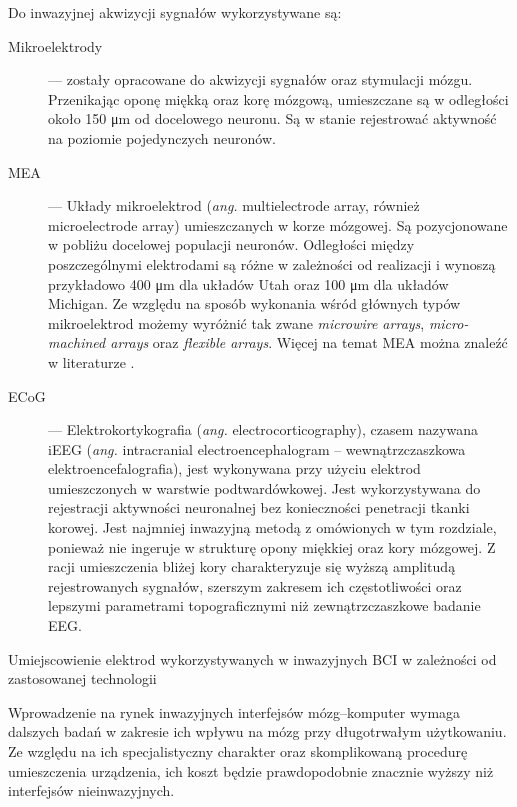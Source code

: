 \documentclass[skorowidz,skroty]{dyplomWEZUT}
\begin{document}
Do inwazyjnej akwizycji sygnałów wykorzystywane są:
\begin{description}
    \item [Mikroelektrody] --- zostały opracowane do akwizycji sygnałów oraz stymulacji mózgu. Przenikając oponę miękką oraz korę mózgową, umieszczane są w odległości około 150 μm od docelowego neuronu\cite{bci_signals_invasive}. Są w stanie rejestrować aktywność na poziomie pojedynczych neuronów.
    \item [MEA] --- Układy mikroelektrod (\textit{ang.} multielectrode array, również microelectrode array) umieszczanych w korze mózgowej. Są pozycjonowane w pobliżu docelowej populacji neuronów. Odległości między poszczególnymi elektrodami są różne w zależności od realizacji i wynoszą przykładowo 400 μm dla układów Utah oraz 100 μm dla układów Michigan\cite{bci_mea}. Ze względu na sposób wykonania wśród głównych typów mikroelektrod możemy wyróżnić tak zwane \textit{microwire arrays}, \textit{micro-machined arrays} oraz \textit{flexible arrays}\cite{bci_mea}. Więcej na temat MEA można znaleźć w literaturze \cite{bci_signals_invasive,bci_mea,bci_principles}.
    \item [ECoG] --- Elektrokortykografia (\textit{ang.} electrocorticography), czasem nazywana iEEG (\textit{ang.} intracranial electroencephalogram -- wewnątrzczaszkowa elektroencefalografia), jest wykonywana przy użyciu elektrod umieszczonych w warstwie podtwardówkowej\cite{bci_signals_invasive}. Jest wykorzystywana do rejestracji aktywności neuronalnej bez konieczności penetracji tkanki korowej. Jest najmniej inwazyjną metodą z omówionych w tym rozdziale, ponieważ nie ingeruje w strukturę opony miękkiej oraz kory mózgowej. Z racji umieszczenia bliżej kory charakteryzuje się wyższą amplitudą rejestrowanych sygnałów, szerszym zakresem ich częstotliwości oraz lepszymi parametrami topograficznymi niż zewnątrzczaszkowe badanie EEG\cite{bci_revolutionizing}.
\end{description}

{Umiejscowienie elektrod wykorzystywanych w inwazyjnych BCI w zależności od zastosowanej technologii}
{\cite{bci_signals_invasive}}

Wprowadzenie na rynek inwazyjnych interfejsów mózg--komputer wymaga dalszych badań w zakresie ich wpływu na mózg przy długotrwałym użytkowaniu\cite{bci_revolutionizing}. Ze względu na ich specjalistyczny charakter oraz skomplikowaną procedurę umieszczenia urządzenia, ich koszt będzie prawdopodobnie znacznie wyższy niż interfejsów nieinwazyjnych. 
\end{document}
